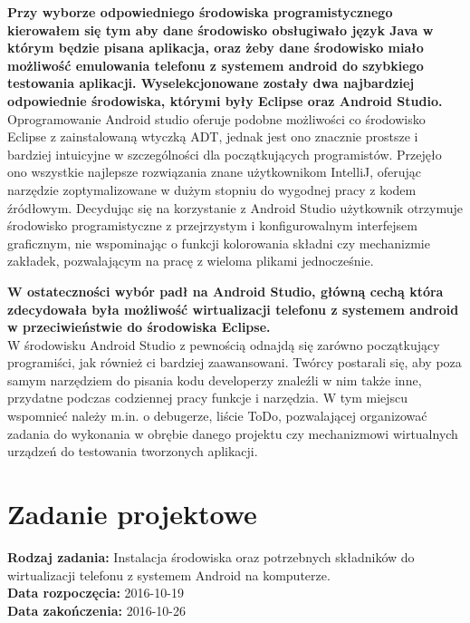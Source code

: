 \textbf{Przy wyborze odpowiedniego środowiska programistycznego kierowałem się tym aby dane środowisko obsługiwało język Java w którym będzie pisana aplikacja, oraz żeby dane środowisko miało możliwość emulowania telefonu z systemem android do szybkiego testowania aplikacji. Wyselekcjonowane zostały dwa  najbardziej odpowiednie środowiska, którymi były Eclipse oraz Android Studio.}
\\

Oprogramowanie Android studio oferuje podobne możliwości co środowisko Eclipse z zainstalowaną wtyczką ADT, jednak jest ono znacznie prostsze i bardziej intuicyjne w szczególności dla początkujących programistów. Przejęło ono wszystkie najlepsze rozwiązania znane użytkownikom IntelliJ, oferując narzędzie zoptymalizowane w dużym stopniu do wygodnej pracy z kodem źródłowym. Decydując się na korzystanie z Android Studio użytkownik otrzymuje środowisko programistyczne z przejrzystym i konfigurowalnym interfejsem graficznym, nie wspominając o funkcji kolorowania składni czy mechanizmie zakładek, pozwalającym na pracę z wieloma plikami jednocześnie.

\textbf{W ostateczności wybór padł na Android Studio, główną cechą która zdecydowała była możliwość wirtualizacji telefonu z systemem android w przeciwieństwie do środowiska Eclipse.}
\\

W środowisku Android Studio z pewnością odnajdą się zarówno początkujący programiści, jak również ci bardziej zaawansowani. Twórcy postarali się, aby poza samym narzędziem do pisania kodu developerzy znaleźli w nim także inne, przydatne podczas codziennej pracy funkcje i narzędzia. W tym miejscu wspomnieć należy m.in. o debugerze, liście ToDo, pozwalającej organizować zadania do wykonania w obrębie danego projektu czy mechanizmowi wirtualnych urządzeń do testowania tworzonych aplikacji.




\section{Zadanie projektowe}
\noindent\textbf{Rodzaj zadania:} Instalacja środowiska oraz potrzebnych składników do wirtualizacji telefonu z systemem Android na komputerze. \\

\noindent\textbf{Data rozpoczęcia:} 2016-10-19\\

\noindent\textbf{Data zakończenia:} 2016-10-26\\
\\

